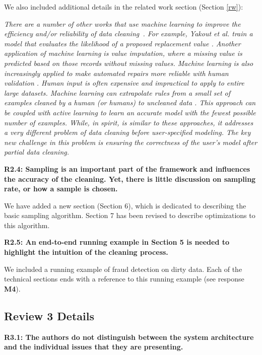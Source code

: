\vspace{0.5em}

We also included additional details in the related work section (Section \ref{rw}):

\emph{There are a number of other works that use machine learning to improve the efficiency and/or reliability of data cleaning~\cite{DBLP:journals/pvldb/YakoutENOI11,yakout2013don,gokhale2014corleone}.
For example, Yakout et al. train a model that evaluates the likelihood of a proposed replacement value \cite{yakout2013don}.
Another application of machine learning is value imputation, where a missing value is predicted based on those records without missing values.
Machine learning is also increasingly applied to make automated repairs more reliable with human validation \cite{DBLP:journals/pvldb/YakoutENOI11}.
Human input is often expensive and impractical to apply to entire large datasets.
Machine learning can extrapolate rules from a small set of examples cleaned by a human (or humans) to uncleaned data \cite{gokhale2014corleone, DBLP:journals/pvldb/YakoutENOI11}.
This approach can be coupled with active learning \cite{DBLP:journals/pvldb/MozafariSFJM14} to learn an accurate model with the fewest possible number of examples.
While, in spirit, \sys is similar to these approaches, it addresses a very different problem of data cleaning before user-specified modeling.
The key new challenge in this problem is ensuring the correctness of the user's model after partial data cleaning.}

\textbf{R2.4: Sampling is an important part of the framework and influences the accuracy of the cleaning. Yet, there is little discussion on sampling rate, or how a sample is chosen.}

We have added a new section (Section 6), which is dedicated to describing the basic sampling algorithm.
Section 7 has been revised to describe optimizations to this algorithm.

\vspace{0.5em}

\textbf{R2.5: An end-to-end running example in Section 5 is needed to highlight the intuition of the cleaning process.}

We included a running example of fraud detection on dirty data. Each of the technical sections ends with a reference to this running example (see response \textbf{M4}).


\vspace{0.5em}


\subsection*{Review 3 Details}
\noindent\textbf{R3.1: The authors do not distinguish between the system architecture and the individual issues that they are presenting.}

